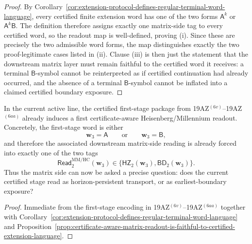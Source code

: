 \begin{proof}
By Corollary~\ref{cor:extension-protocol-defines-regular-terminal-word-language}, every certified finite extension word has one of the two forms \(\mathsf A^k\) or \(\mathsf A^k\mathsf B\). The definition therefore assigns exactly one matrix-side tag to every certified word, so the readout map is well-defined, proving (i). Since these are precisely the two admissible word forms, the map distinguishes exactly the two proof-legitimate cases listed in (ii). Clause (iii) is then just the statement that the downstream matrix layer must remain faithful to the certified word it receives: a terminal \(\mathsf B\)-symbol cannot be reinterpreted as if certified continuation had already occurred, and the absence of a terminal \(\mathsf B\)-symbol cannot be inflated into a claimed certified boundary exposure.
\end{proof}

\begin{corollary}
\label{cor:present-sigma3-package-already-induces-first-certificate-aware-matrix-reading}
In the current active line, the certified first-stage package from 19AZ$^{(6v)}$--19AZ$^{(6aa)}$ already induces a first certificate-aware Heisenberg/Millennium readout. Concretely, the first-stage word is either
\[
 \mathbf w_3=\mathsf A
 \qquad\text{or}\qquad
 \mathbf w_3=\mathsf B,
\]
and therefore the associated downstream matrix-side reading is already forced into exactly one of the two tags
\[
 \mathsf{Read}^{\mathrm{MM/HC}}_{2}(\mathbf w_3)
 \in
 \{\mathsf{HZ}_{2}(\mathbf w_3),\mathsf{BD}_{2}(\mathbf w_3)\}.
\]
Thus the matrix side can now be asked a precise question: does the current certified stage read as horizon-persistent transport, or as earliest-boundary exposure?
\end{corollary}

\begin{proof}
Immediate from the first-stage encoding in 19AZ$^{(6v)}$--19AZ$^{(6aa)}$ together with Corollary~\ref{cor:extension-protocol-defines-regular-terminal-word-language} and Proposition~\ref{prop:certificate-aware-matrix-readout-is-faithful-to-certified-extension-language}.
\end{proof}

